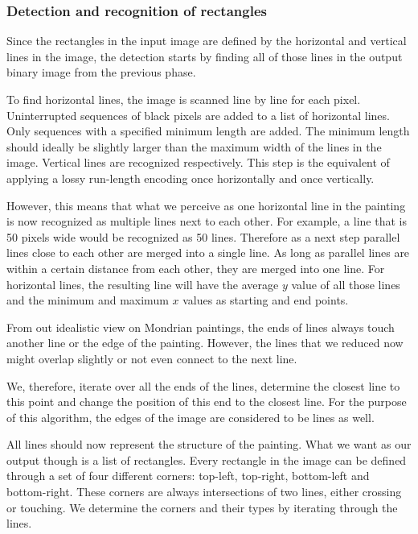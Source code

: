 
\subsubsection{Detection and recognition of rectangles} \label{rectangles}

Since the rectangles in the input image are defined by the horizontal and
vertical lines in the image, the detection starts by finding all of those lines
in the output binary image from the previous phase.


To find horizontal lines, the image is scanned line by line for each pixel.
Uninterrupted sequences of black pixels are added to a list of horizontal lines.
Only sequences with a specified minimum length are added. The minimum length
should ideally be slightly larger than the maximum width of the lines in the
image. Vertical lines are recognized respectively. This step is the equivalent of
applying a lossy run-length encoding once horizontally and once vertically.

However, this means that what we perceive as one horizontal line in the painting
is now recognized as multiple lines next to each other. For example, a line that
is 50 pixels wide would be recognized as 50 lines. Therefore as a next step
parallel lines close to each other are merged into a single line. As long as
parallel lines are within a certain distance from each other, they are merged
into one line. For horizontal lines, the resulting line will have the average
$y$ value of all those lines and the minimum and maximum $x$ values as starting
and end points.

From out idealistic view on Mondrian paintings, the ends of lines always touch
another line or the edge of the painting. However, the lines that we reduced now
might overlap slightly or not even connect to the next line.


We, therefore, iterate over all the ends of the lines, determine the closest
line to this point and change the position of this end to the closest line. For
the purpose of this algorithm, the edges of the image are considered to be lines
as well.


All lines should now represent the structure of the painting. What we want as
our output though is a list of rectangles. Every rectangle in the image can be
defined through a set of four different corners: top-left, top-right,
bottom-left and bottom-right. These corners are always intersections of two
lines, either crossing or touching. We determine the corners and their types by
iterating through the lines.

